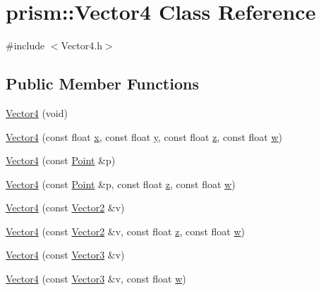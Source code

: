 \hypertarget{classprism_1_1_vector4}{}\section{prism\+:\+:Vector4 Class Reference}
\label{classprism_1_1_vector4}


{\ttfamily \#include $<$Vector4.\+h$>$}

\subsection*{Public Member Functions}
\begin{DoxyCompactItemize}
\item 
\hyperlink{classprism_1_1_vector4_a1077cb6a3ea73ab0171ab5909a96dd42}{Vector4} (void)
\item 
\hyperlink{classprism_1_1_vector4_ad097e262e55f67cc849daa101b192076}{Vector4} (const float \hyperlink{classprism_1_1_vector4_a8fabd6d4da0effcc6073f7ae67cb1c1c}{x}, const float \hyperlink{classprism_1_1_vector4_ad865f8e0bf0379640510d0be932ba099}{y}, const float \hyperlink{classprism_1_1_vector4_ae910baf9cdab3dbdf7add459a34c704c}{z}, const float \hyperlink{classprism_1_1_vector4_a099427d4aea1e37acadc3557d04a1d4c}{w})
\item 
\hyperlink{classprism_1_1_vector4_aae2d2af5837ffcdc7960eb956cf54cca}{Vector4} (const \hyperlink{classprism_1_1_point}{Point} \&p)
\item 
\hyperlink{classprism_1_1_vector4_ae09bb0d398cb836cb92291be056e27c3}{Vector4} (const \hyperlink{classprism_1_1_point}{Point} \&p, const float \hyperlink{classprism_1_1_vector4_ae910baf9cdab3dbdf7add459a34c704c}{z}, const float \hyperlink{classprism_1_1_vector4_a099427d4aea1e37acadc3557d04a1d4c}{w})
\item 
\hyperlink{classprism_1_1_vector4_a4c069ee43bcc2793c443534763498200}{Vector4} (const \hyperlink{classprism_1_1_vector2}{Vector2} \&v)
\item 
\hyperlink{classprism_1_1_vector4_abdf55a5ad526c2b615e6cba1b1b451a8}{Vector4} (const \hyperlink{classprism_1_1_vector2}{Vector2} \&v, const float \hyperlink{classprism_1_1_vector4_ae910baf9cdab3dbdf7add459a34c704c}{z}, const float \hyperlink{classprism_1_1_vector4_a099427d4aea1e37acadc3557d04a1d4c}{w})
\item 
\hyperlink{classprism_1_1_vector4_a88695d79edfe862a13fc940c2e278892}{Vector4} (const \hyperlink{classprism_1_1_vector3}{Vector3} \&v)
\item 
\hyperlink{classprism_1_1_vector4_a43313928f6c97f358af79ea6efd55acd}{Vector4} (const \hyperlink{classprism_1_1_vector3}{Vector3} \&v, const float \hyperlink{classprism_1_1_vector4_a099427d4aea1e37acadc3557d04a1d4c}{w})

\end{DoxyCompactItemize}
